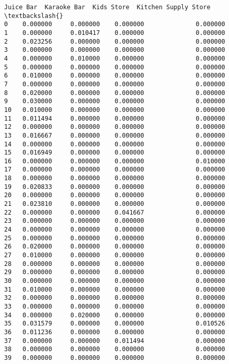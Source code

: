 \documentclass[11pt]{article}
\begin{document}
\begin{tcolorbox}[breakable, size=fbox, boxrule=.5pt, pad at break*=1mm, opacityfill=0]
\begin{Verbatim}[commandchars=\\\{\}]
    Juice Bar  Karaoke Bar  Kids Store  Kitchen Supply Store  \textbackslash{}
0    0.000000     0.000000    0.000000              0.000000
1    0.000000     0.010417    0.000000              0.000000
2    0.023256     0.000000    0.000000              0.000000
3    0.000000     0.000000    0.000000              0.000000
4    0.000000     0.010000    0.000000              0.000000
5    0.000000     0.000000    0.000000              0.000000
6    0.010000     0.000000    0.000000              0.000000
7    0.000000     0.000000    0.000000              0.000000
8    0.020000     0.000000    0.000000              0.000000
9    0.030000     0.000000    0.000000              0.000000
10   0.010000     0.000000    0.000000              0.000000
11   0.011494     0.000000    0.000000              0.000000
12   0.000000     0.000000    0.000000              0.000000
13   0.016667     0.000000    0.000000              0.000000
14   0.000000     0.000000    0.000000              0.000000
15   0.016949     0.000000    0.000000              0.000000
16   0.000000     0.000000    0.000000              0.010000
17   0.000000     0.000000    0.000000              0.000000
18   0.000000     0.000000    0.000000              0.000000
19   0.020833     0.000000    0.000000              0.000000
20   0.000000     0.000000    0.000000              0.000000
21   0.023810     0.000000    0.000000              0.000000
22   0.000000     0.000000    0.041667              0.000000
23   0.000000     0.000000    0.000000              0.000000
24   0.000000     0.000000    0.000000              0.000000
25   0.000000     0.000000    0.000000              0.000000
26   0.020000     0.000000    0.000000              0.000000
27   0.010000     0.000000    0.000000              0.000000
28   0.000000     0.000000    0.000000              0.000000
29   0.000000     0.000000    0.000000              0.000000
30   0.000000     0.000000    0.000000              0.000000
31   0.010000     0.000000    0.000000              0.000000
32   0.000000     0.000000    0.000000              0.000000
33   0.000000     0.000000    0.000000              0.000000
34   0.000000     0.020000    0.000000              0.000000
35   0.031579     0.000000    0.000000              0.010526
36   0.011236     0.000000    0.000000              0.000000
37   0.000000     0.000000    0.011494              0.000000
38   0.000000     0.000000    0.000000              0.000000
39   0.000000     0.000000    0.000000              0.000000


\end{Verbatim}
\end{tcolorbox}
\end{document}
